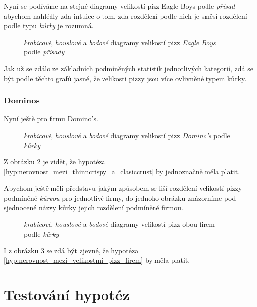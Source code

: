 Nyní se podíváme na stejné diagramy velikostí pizz Eagle Boys podle \emph{přísad} abychom
nahlédly zda intuice o tom, zda rozdělení podle nich je směsí rozdělení podle typu \emph{kůrky} je
rozumná.

\begin{figure}[H]
	\centering
	
	\caption{\emph{krabicové}, \emph{houslové} a \emph{bodové} diagramy velikostí pizz \emph{Eagle Boys} podle \emph{přísady}}
	\label{fig:eagleboys_topping_diagrams}
\end{figure}

Jak už se zdálo ze základních podmíněných statistik jednotlivých kategorií, zdá se být podle těchto
grafů jasné, že velikosti pizzy jsou více ovlivněné typem kůrky.

\subsubsection*{Dominos}%
\label{ssub:graficke_znazorneni_dominos}

Nyní ještě pro firmu Domino's.

\nopagebreak

\begin{figure}[H]
	\centering
	
	\caption{\emph{krabicové}, \emph{houslové} a \emph{bodové} diagramy velikostí pizz \emph{Domino's} podle \emph{kůrky}}
	\label{fig:dominos_crust_diagrams}
\end{figure}

Z obrázku \ref{fig:dominos_crust_diagrams} je vidět, že hypotéza
\ref{hyp:nerovnost_mezi_thinncrispy_a_clasiccrust} by jednoznačně měla platit.

Abychom ještě měli představu jakým způsobem se liší rozdělení velikostí pizzy podmíněné \emph{kůrkou} pro
jednotlivé firmy, do jednoho obrázku znázorníme pod sjednocené názvy kůrky jejich rozdělení
podmíněné firmou.

\begin{figure}[H]
	\centering
	
	\caption{\emph{krabicové}, \emph{houslové} a \emph{bodové} diagramy velikostí pizz obou firem podle \emph{kůrky}}
	\label{fig:stores_crust_diagrams}
\end{figure}

I z obrázku \ref{fig:stores_crust_diagrams} se zdá být zjevné, že hypotéza
\ref{hyp:nerovnost_mezi_velikostmi_pizz_firem} by měla platit.

\section{Testování hypotéz}%
\label{sec:testování_hypotéz}

